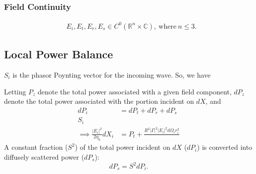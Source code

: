 \documentclass{article}
\begin{document}
\subsubsection{Field Continuity}
\begin{align}
   &E_i, E_t, E_r, E_s \in C^0( \mathbb{R}^n \times \mathbb{C} ), \ \text{where} \ n
      \leq 3. 
   \label{eq:fieldContinuity}
\end{align}
\vspace{-\belowdisplayskip} 
\vspace{-\parskip}
\setcounter{equation}{0}
\subsection{Local Power Balance}
$S_i$ is the phasor Poynting vector for the incoming wave. So, we have %


Letting $P_z$ denote the total power associated with a given field component, $dP_z$
denote the total power associated with the portion incident on $dX$, and 
\begin{align}
   dP_i &= dP_t + dP_r + dP_s \nonumber \\
   S_i \nonumber \\
   \implies \frac{|E_i|^2}{2 \eta_0}dX_i &= P_t + \frac{R^2 |\Gamma|^2
   |E_i|^2 d \Omega_i r_i^2}{} \nonumber
\end{align}
A constant fraction ($S^2$) of the total power incident on $dX$ ($dP_i$) is converted
into diffusely scattered power ($dP_s$): 
\begin{equation}
   dP_s = S^2 dP_i.
   \label{eq:sDef}
\end{equation}
\end{document}
